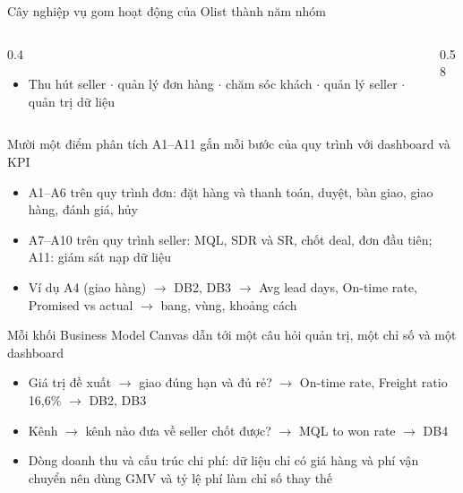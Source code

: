 \begin{frame}{Cây nghiệp vụ gom hoạt động của Olist thành năm nhóm}
\begin{columns}[T]\begin{column}{0.4\textwidth}
\begin{itemize}
  \item Thu hút seller $\cdot$ quản lý đơn hàng $\cdot$ chăm sóc khách $\cdot$ quản lý seller $\cdot$ quản trị dữ liệu
\end{itemize}
\end{column}\begin{column}{0.58\textwidth}
\begin{center}\end{center}
\end{column}\end{columns}

\end{frame}

\begin{frame}{Mười một điểm phân tích A1--A11 gắn mỗi bước của quy trình với dashboard và KPI}
\begin{itemize}
  \item A1--A6 trên quy trình đơn: đặt hàng và thanh toán, duyệt, bàn giao, giao hàng, đánh giá, hủy
  \item A7--A10 trên quy trình seller: MQL, SDR và SR, chốt deal, đơn đầu tiên; A11: giám sát nạp dữ liệu
  \item Ví dụ A4 (giao hàng) $\rightarrow$ DB2, DB3 $\rightarrow$ Avg lead days, On-time rate, Promised vs actual $\rightarrow$ bang, vùng, khoảng cách
\end{itemize}

\end{frame}

\begin{frame}{Mỗi khối Business Model Canvas dẫn tới một câu hỏi quản trị, một chỉ số và một dashboard}
\begin{itemize}
  \item Giá trị đề xuất $\rightarrow$ giao đúng hạn và đủ rẻ? $\rightarrow$ On-time rate, Freight ratio 16,6\% $\rightarrow$ DB2, DB3
  \item Kênh $\rightarrow$ kênh nào đưa về seller chốt được? $\rightarrow$ MQL to won rate $\rightarrow$ DB4
  \item Dòng doanh thu và cấu trúc chi phí: dữ liệu chỉ có giá hàng và phí vận chuyển nên dùng GMV và tỷ lệ phí làm chỉ số thay thế
\end{itemize}

\end{frame}

